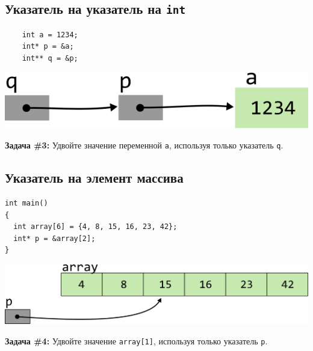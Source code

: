 \documentclass{article}
\begin{document}
\subsection*{Указатель на указатель на \texttt{int}}

\begin{multicols}{2}
\begin{lstlisting}
	int a = 1234;
	int* p = &a;
	int** q = &p;
\end{lstlisting}
\columnbreak
\begin{center}
\includegraphics[scale=1]{../../images/pointer_schemes/pointer_to_pointer_to_int.png}
\end{center}
\end{multicols}
\textbf{Задача \#3:} Удвойте значение переменной \texttt{a}, используя только указатель \texttt{q}.

\newpage
\subsection*{Указатель на элемент массива}
\begin{multicols}{2}
\begin{lstlisting}
int main()
{
  int array[6] = {4, 8, 15, 16, 23, 42};
  int* p = &array[2];
}
\end{lstlisting}
\columnbreak
\begin{center}
\includegraphics[scale=0.75]{../../images/pointer_schemes/pointer_to_array_of_ints.png}
\end{center}
\end{multicols}

\textbf{Задача \#4:} Удвойте значение \texttt{array[1]}, используя только указатель \texttt{p}.
\end{document}
